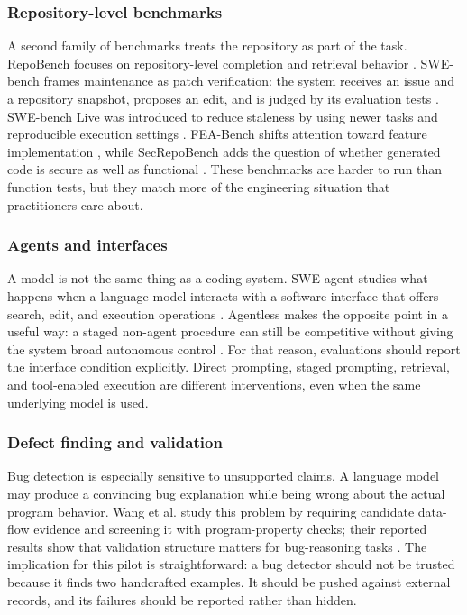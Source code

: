 \documentclass[preprint,12pt]{elsarticle}
\begin{document}
\subsubsection{Repository-level benchmarks}
A second family of benchmarks treats the repository as part of the task. RepoBench focuses on repository-level completion and retrieval behavior \cite{liu2023repobench}. SWE-bench frames maintenance as patch verification: the system receives an issue and a repository snapshot, proposes an edit, and is judged by its evaluation tests \cite{jimenez2023swebench}. SWE-bench Live was introduced to reduce staleness by using newer tasks and reproducible execution settings \cite{zhang2025swebenchlive}. FEA-Bench shifts attention toward feature implementation \cite{li2025feabench}, while SecRepoBench adds the question of whether generated code is secure as well as functional \cite{shen2025secrepobench}. These benchmarks are harder to run than function tests, but they match more of the engineering situation that practitioners care about.

\subsubsection{Agents and interfaces}
A model is not the same thing as a coding system. SWE-agent studies what happens when a language model interacts with a software interface that offers search, edit, and execution operations \cite{yang2024sweagent}. Agentless makes the opposite point in a useful way: a staged non-agent procedure can still be competitive without giving the system broad autonomous control \cite{xia2024agentless}. For that reason, evaluations should report the interface condition explicitly. Direct prompting, staged prompting, retrieval, and tool-enabled execution are different interventions, even when the same underlying model is used.

\subsubsection{Defect finding and validation}
Bug detection is especially sensitive to unsupported claims. A language model may produce a convincing bug explanation while being wrong about the actual program behavior. Wang et al. study this problem by requiring candidate data-flow evidence and screening it with program-property checks; their reported results show that validation structure matters for bug-reasoning tasks \cite{wang2024llmsan}. The implication for this pilot is straightforward: a bug detector should not be trusted because it finds two handcrafted examples. It should be pushed against external records, and its failures should be reported rather than hidden.
\end{document}
